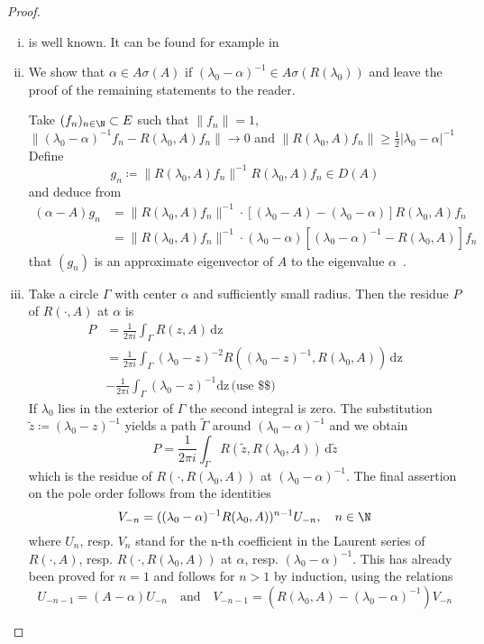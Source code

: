 \begin{proof}
\begin{enumerate}[(i), wide]
\item 
is well known. It can be found for example in \citet[VII.9.2]{dunfordschwartz:1958}

\item 
We show that $\alpha \in A\sigma(A)$ if $(\lambda_{0}-\alpha)^{-1} \in A\sigma(R(\lambda_{0}))$ and leave the proof of the remaining statements to the reader.

Take $(f_{n})_{n \in \N} \subset E$ such that $\|f_{n}\| = 1$, $\|(\lambda_{0}-\alpha)^{-1}f_{n} - R(\lambda_{0},A)f_{n}\| \to 0$ and $\|R(\lambda_{0},A)f_{n}\| \geq \frac{1}{2}|\lambda_{0} - \alpha|^{-1}$
Define
\[
g_{n} \coloneqq \|R(\lambda_{0},A)f_{n}\|^{-1}R(\lambda_{0},A)f_{n} \in D(A)
\]
and deduce from
\begin{align*}
(\alpha-A)g_{n} &= \|R(\lambda_{0},A)f_{n}\|^{-1} \cdot [(\lambda_{0}-A) - (\lambda_{0}-\alpha)]R(\lambda_{0},A)f_{n} \\
&= \|R(\lambda_{0},A)f_{n}\|^{-1} \cdot (\lambda_{0}-\alpha)[(\lambda_{0}-\alpha)^{-1} - R(\lambda_{0},A)]f_{n}
\end{align*}
that $(g_{n})$ is an approximate eigenvector of $A$ to the eigenvalue $\alpha$~.

\item 
Take a circle $\Gamma$ with center $\alpha$ and sufficiently small radius. 
Then the residue $P$ of $R(\cdot,A)$ at $\alpha$ is
\begin{align*}
P &= \frac{1}{2\pi i} \int_{\Gamma} R(z,A) \, \mathrm{dz} \\
&= \frac{1}{2\pi i} \int_{\Gamma} (\lambda_{0}-z)^{-2}R((\lambda_{0}-z)^{-1},R(\lambda_{0},A)) \, \mathrm{dz} \\
&- \frac{1}{2\pi i} \int_{\Gamma}(\lambda_{0}-z)^{-1} \mathrm{dz} \, \text{(use \$\$)}
\end{align*}
If $\lambda_{0}$ lies in the exterior of $\Gamma$ the second integral is zero.
The substitution $\tilde{z} \coloneqq (\lambda_{0} - z)^{-1}$ yields a path $\tilde{\Gamma}$ around $(\lambda_{0}-\alpha)^{-1}$ and we obtain
\[
P = \frac{1}{2\pi i} \int_{\Gamma} R(\tilde{z},R(\lambda_{0},A)) \, \mathrm{d}\tilde{z}
\]
which is the residue of $R(\cdot,R(\lambda_{0},A))$ at $(\lambda_{0}-\alpha)^{-1}$.
The final assertion on the pole order follows from the identities
\[
V_{-n} = ((\lambda_{0}-\alpha)^{-1}R(\lambda_{0},A))^{n-1}U_{-n}, \quad n \in \N
\]
where $U_{n}$, resp. $V_{n}$ stand for the n-th coefficient in the Laurent series of $R(\cdot,A)$, resp. $R(\cdot,R(\lambda_{0},A))$ at $\alpha$, resp. $(\lambda_{0}-\alpha)^{-1}$.
This has already been proved for $n = 1$ and follows for $n > 1$ by induction, using the relations
\[
U_{-n-1} = (A - \alpha)U_{-n} \quad \text{and} \quad V_{-n-1} = (R(\lambda_{0},A) - (\lambda_{0}-\alpha)^{-1})V_{-n}
\]
\end{enumerate}
\end{proof}


